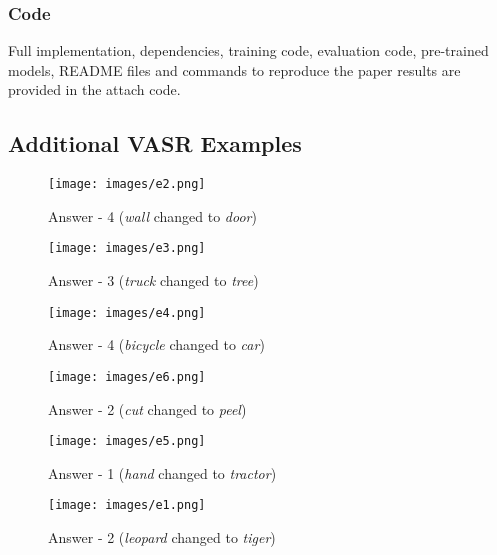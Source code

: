 \documentclass[letterpaper]{article} \usepackage{aaai23}  \usepackage{times}  \usepackage{helvet}  \usepackage{courier}  \usepackage[hyphens]{url}  \usepackage{graphicx} \urlstyle{rm} \def\UrlFont{\rm}  \usepackage{natbib}  \usepackage{caption} \frenchspacing  \setlength{\pdfpagewidth}{8.5in}  \setlength{\pdfpageheight}{11in}  \usepackage{algorithm}
\begin{document}
\subsubsection{Code}
Full implementation, dependencies, training code, evaluation code, pre-trained models, README files and commands to reproduce the paper results are provided in the attach code. 

\subsection{Additional VASR Examples}
\label{sec:additional_examples}


\begin{figure}[!h]
\centering
\newcommand{\figlen}[0]{\columnwidth}
    \texttt{[image: images/e2.png]}\\
    \caption{Answer - 4 (\emph{wall} changed to \emph{door})}
    \label{fig:e2}
\end{figure}

\begin{figure}[!h]
\centering
\newcommand{\figlen}[0]{\columnwidth}
    \texttt{[image: images/e3.png]}\\
    \caption{Answer - 3 (\emph{truck} changed to \emph{tree})}
    \label{fig:e3}
\end{figure}

\begin{figure}[!h]
\centering
\newcommand{\figlen}[0]{\columnwidth}
    \texttt{[image: images/e4.png]}\\
    \caption{Answer - 4 (\emph{bicycle} changed to \emph{car})}
    \label{fig:e4}
\end{figure}

\begin{figure}[!h]
\centering
\newcommand{\figlen}[0]{\columnwidth}
    \texttt{[image: images/e6.png]}\\
    \caption{Answer - 2 (\emph{cut} changed to \emph{peel})}
    \label{fig:e6}
\end{figure}

\begin{figure}[!h]
\centering
\newcommand{\figlen}[0]{\columnwidth}
    \texttt{[image: images/e5.png]}\\
    \caption{Answer - 1 (\emph{hand} changed to \emph{tractor})}
    \label{fig:e5}
\end{figure}

\begin{figure}[!h]
\centering
\newcommand{\figlen}[0]{\columnwidth}
    \texttt{[image: images/e1.png]}\\
    \caption{Answer - 2 (\emph{leopard} changed to \emph{tiger})}
    \label{fig:e1}
\end{figure}
\end{document}
